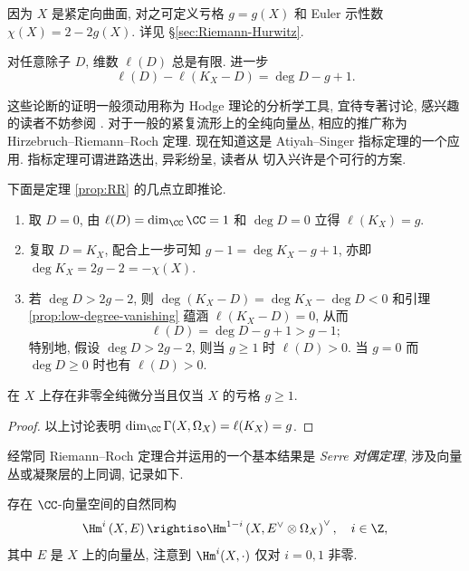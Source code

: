 因为 $X$ 是紧定向曲面, 对之可定义亏格 $g = g(X)$ 和 Euler 示性数 $\chi(X) = 2 - 2g(X)$. 详见 \S\ref{sec:Riemann-Hurwitz}.

\begin{theorem}\label{prop:RR} 
	对任意除子 $D$, 维数 $\ell(D)$ 总是有限. 进一步
	\[ \ell(D) - \ell(K_X - D) = \deg D - g + 1. \]
\end{theorem}

这些论断的证明一般须动用称为 Hodge 理论的分析学工具, 宜待专著讨论, 感兴趣的读者不妨参阅 \cite[第三章]{Mei13}. 对于一般的紧复流形上的全纯向量丛, 相应的推广称为 Hirzebruch--Riemann--Roch 定理. 现在知道这是 Atiyah--Singer 指标定理的一个应用. 指标定理可谓进路迭出, 异彩纷呈, 读者从 \cite[Theorem 4.10]{BGV04} 切入兴许是个可行的方案.

\begin{remark}\label{rem:RR}
	下面是定理 \ref{prop:RR} 的几点立即推论.
	\begin{enumerate}
		\item 取 $D=0$, 由 $\ell(D) = \dim_{\CC} \CC = 1$ 和 $\deg D = 0$ 立得 $\ell(K_X) = g$.
		\item 复取 $D=K_X$, 配合上一步可知 $g-1 = \deg K_X - g + 1$, 亦即 $\deg K_X = 2g - 2 = -\chi(X)$.
		\item 若 $\deg D > 2g-2$, 则 $\deg(K_X-D) = \deg K_X - \deg D < 0$ 和引理 \ref{prop:low-degree-vanishing} 蕴涵 $\ell(K_X-D) = 0$, 从而
		\[ \ell(D) = \deg D - g + 1 > g-1; \]
		特别地, 假设 $\deg D > 2g-2$, 则当 $g \geq 1$ 时 $\ell(D) > 0$. 当 $g=0$ 而 $\deg D \geq 0$ 时也有 $\ell(D) > 0$.
	\end{enumerate}
\end{remark}

\begin{corollary}
	在 $X$ 上存在非零全纯微分当且仅当 $X$ 的亏格 $g \geq 1$.
\end{corollary}
\begin{proof}
	以上讨论表明 $\dim_{\CC} \Gamma(X, \Omega_X) = \ell(K_X) = g$.
\end{proof}

经常同 Riemann--Roch 定理合并运用的一个基本结果是 \emph{Serre 对偶定理}, 涉及向量丛或凝聚层的上同调, 记录如下.
\begin{theorem}[J.-P.\ Serre]\label{prop:Serre-duality} 
	存在 $\CC$-向量空间的自然同构
	\[ \Hm^i\left(X, E\right) \rightiso \Hm^{1-i}\left(X, E^\vee \otimes \Omega_X \right)^\vee, \quad i \in \Z, \]
	其中 $E$ 是 $X$ 上的向量丛, 注意到 $\Hm^i(X, \cdot)$ 仅对 $i = 0, 1$ 非零.
\end{theorem}

